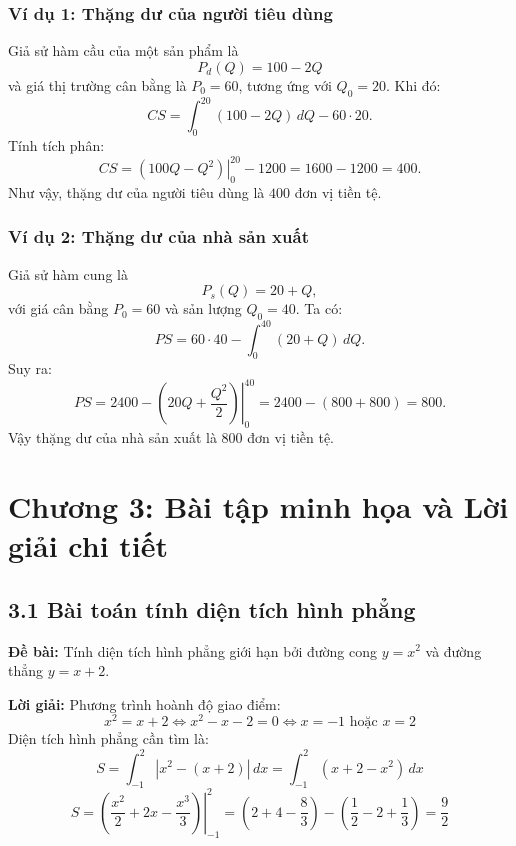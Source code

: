 \documentclass[12pt,a4paper]{article}
\begin{document}
\subsubsection*{Ví dụ 1: Thặng dư của người tiêu dùng}
Giả sử hàm cầu của một sản phẩm là
\[
P_d(Q)=100-2Q
\]
và giá thị trường cân bằng là $P_0=60$, tương ứng với $Q_0=20$.
Khi đó:
\[
CS=\int_0^{20}(100-2Q)\,dQ-60\cdot20.
\]
Tính tích phân:
\[
CS=\left.(100Q-Q^2)\right|_0^{20}-1200
=1600-1200=400.
\]
Như vậy, thặng dư của người tiêu dùng là $400$ đơn vị tiền tệ.

\subsubsection*{Ví dụ 2: Thặng dư của nhà sản xuất}
Giả sử hàm cung là
\[
P_s(Q)=20+Q,
\]
với giá cân bằng $P_0=60$ và sản lượng $Q_0=40$.
Ta có:
\[
PS=60\cdot40-\int_0^{40}(20+Q)\,dQ.
\]
Suy ra:
\[
PS=2400-\left.(20Q+\frac{Q^2}{2})\right|_0^{40}
=2400-(800+800)=800.
\]
Vậy thặng dư của nhà sản xuất là $800$ đơn vị tiền tệ.

\section{Chương 3: Bài tập minh họa và Lời giải chi tiết}

\subsection{3.1 Bài toán tính diện tích hình phẳng}
\textbf{Đề bài:} Tính diện tích hình phẳng giới hạn bởi đường cong $y = x^2$ và đường thẳng $y = x + 2$. \\

\begin{center}
\end{center}
\textbf{Lời giải:}
Phương trình hoành độ giao điểm:
\[ x^2 = x + 2 \Leftrightarrow x^2 - x - 2 = 0 \Leftrightarrow x = -1 \text{ hoặc } x = 2 \]
Diện tích hình phẳng cần tìm là:
\[ S = \int_{-1}^{2} |x^2 - (x + 2)| \, dx = \int_{-1}^{2} (x + 2 - x^2) \, dx \]
\[ S = \left. \left( \frac{x^2}{2} + 2x - \frac{x^3}{3} \right) \right|_{-1}^{2} = \left( 2 + 4 - \frac{8}{3} \right) - \left( \frac{1}{2} - 2 + \frac{1}{3} \right) = \frac{9}{2} \]
\end{document}
